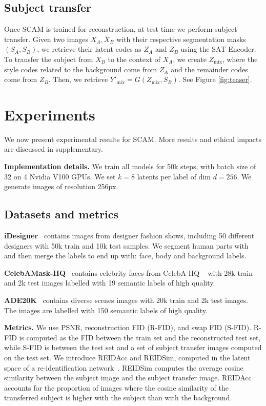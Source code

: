 \documentclass[runningheads]{llncs}
\makeatletter
\newcommand{\mname}{SCAM\@\xspace}
\makeatother
\begin{document}
\subsection{Subject transfer}
Once \mname is trained for reconstruction, at test time we perform subject transfer. 
Given two images $X_{A},X_{B}$ with their respective segmentation masks $(S_A,S_B)$, we retrieve their latent codes as $Z_A$ and $Z_B$ using the SAT-Encoder. To transfer the subject from $X_B$ to the context of $X_A$, we create $Z_{\text{mix}}$, where the style codes related to the background come from $Z_A$ and the remainder codes come from $Z_B$. Then, we retrieve $Y'_\text{mix} {=} G(Z_{\text{mix}},S_B)$. See Figure \ref{fig:teaser}.



 
\section{Experiments}
\label{sec:experiments}

We now present experimental results for \mname . More results and ethical impacts are discussed in supplementary.

\noindent \textbf{Implementation details.}
We train all models for 50k steps, with batch size of 32 on 4 Nvidia V100 GPUs. We set $k{=}8$ latents per label of dim $d{=}256$. We generate images of resolution 256px.



\subsection{Datasets and metrics}




\noindent \textbf{iDesigner}~\cite{idesigner} contains images from designer fashion shows, including 50 different designers with 50k train and 10k test samples.
We segment human parts with~\cite{li2019selfcorrection} and then merge the labels to end up with: face, body and background labels.

\noindent \textbf{CelebAMask-HQ}~\cite{lee2020maskgan} contains celebrity faces from CelebA-HQ ~\cite{karras2018progressive} with 28k train and 2k test images labelled with 19 semantic labels of high quality. 

\noindent \textbf{ADE20K}~\cite{zhou2017scene} contains diverse scenes images with 20k train and 2k test images. The images are labelled with 150 semantic labels of high quality.

\noindent \textbf{Metrics.} We use PSNR, reconstruction FID (R-FID), and swap FID (S-FID). R-FID is computed as the FID between the train set and the reconstructed test set, while S-FID is between the test set and a set of subject transfer images computed on the test set. We introduce REIDAcc and REIDSim, computed in the latent space of a re-identification network~\cite{fu2021unsupervised}. REIDSim computes the average cosine similarity between the subject image and the subject transfer image. REIDAcc accounts for the proportion of images where the cosine similarity of the transferred subject is higher with the subject than with the background.
\end{document}
